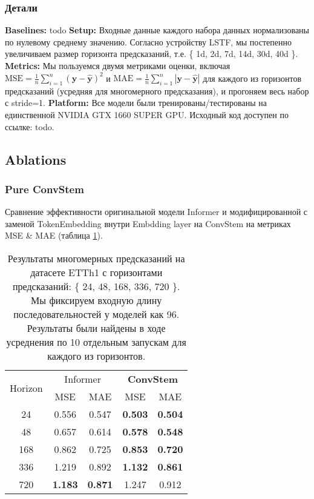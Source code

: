 
\subsubsection{Детали}

\textbf{Baselines:} {\color{red} todo}
\textbf{Setup:} Входные данные каждого набора данных нормализованы по нулевому среднему значению. 
Согласно устройству LSTF, мы постепенно увеличиваем размер горизонта предсказаний, 
т.е. \{ 1d, 2d, 7d, 14d, 30d, 40d \}.
\textbf{Metrics:} Мы пользуемся двумя метриками оценки, включая 
$\text{MSE}=\frac{1}{n} \sum_{i=1}^n (\bm{y} - \hat{\bm{y}})^2$ 
и $\text{MAE}=\frac{1}{n} \sum_{i=1}^n |\bm{y} - \hat{\bm{y}}|$ 
для каждого из горизонтов предсказаний (усредняя для многомерного 
предсказания), и прогоняем весь набор с stride=1.
\textbf{Platform:}
Все модели были тренированы/тестированы на единственной 
NVIDIA GTX 1660 SUPER GPU. Исходный код доступен 
по ссылке: {\color{red} todo}.

\subsection{Ablations}

\subsubsection{Pure ConvStem}

Сравнение эффективности оригинальной модели Informer и модифицированной
с заменой TokenEmbedding внутри Embdding layer на ConvStem 
на метриках MSE \& MAE (таблица \ref{tab:etth1-convstem}).

\begin{table}[!ht]
    \centering
    \begin{tabular}{c  cc  cc}
    \toprule
    \multirow{2}{*}{{Horizon}} 
      & \multicolumn{2}{c}{{Informer}} 
      & \multicolumn{2}{c}{\textbf{ConvStem}} \\
    \cmidrule(lr){2-3} \cmidrule(lr){4-5}
      & {MSE} & {MAE} 
      & {MSE} & {MAE} \\
    \midrule
    24   & 0.556 & 0.547 & \textbf{0.503} & \textbf{0.504} \\
    48   & 0.657 & 0.614 & \textbf{0.578} & \textbf{0.548} \\
    168  & 0.862 & 0.725 & \textbf{0.853} & \textbf{0.720} \\
    336  & 1.219 & 0.892 & \textbf{1.132} & \textbf{0.861} \\
    720  & \textbf{1.183} & \textbf{0.871} & 1.247 & 0.912 \\
    \bottomrule
    \end{tabular}
    \caption{Результаты многомерных предсказаний на датасете ETTh1 с 
    горизонтами предсказаний: \{ 24, 48, 168, 336, 720 \}. 
    Мы фиксируем входную длину последовательностей у моделей как 96.
    Результаты были найдены в ходе усреднения по 10 отдельным запускам 
    для каждого из горизонтов.}
    \label{tab:etth1-convstem}
\end{table}

